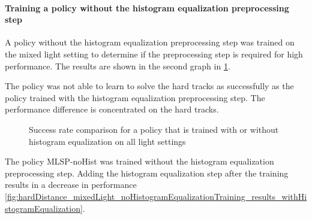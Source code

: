 \paragraph{Training a policy without the histogram equalization preprocessing step}
A policy without the histogram equalization preprocessing step was trained on the mixed light setting to determine if the preprocessing step is required for high performance. The results are shown in the second graph in \ref{fig:hardDistance_mixedLight_noHistogramEqualizationTraining_results}. 

The policy was not able to learn to solve the hard tracks as successfully as the policy trained with the histogram equalization preprocessing step. The performance difference is concentrated on the hard tracks.

\begin{figure}
    \centering
    \caption{Success rate comparison for a policy that is trained with or without histogram equalization on all light settings}
    \label{fig:hardDistance_mixedLight_noHistogramEqualizationTraining_results}
\end{figure}


The policy \ac{MLSP-noHist} was trained without the histogram equalization preprocessing step. Adding the histogram equalization step after the training results in a decrease in performance \ref{fig:hardDistance_mixedLight_noHistogramEqualizationTraining_results_withHistogramEqualization}. 

